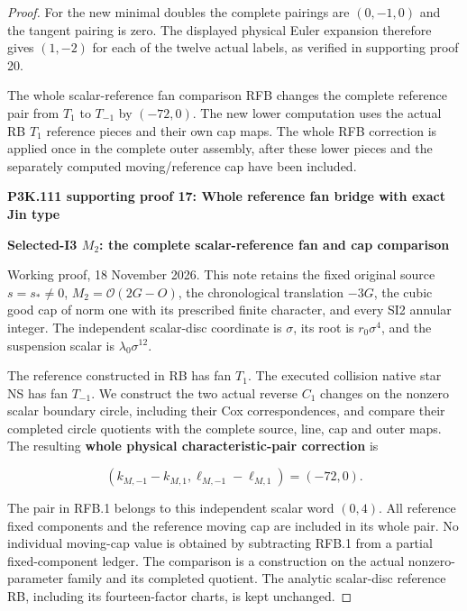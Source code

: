 \begin{proof}
For the new minimal doubles the complete pairings are
\((0,-1,0)\) and the tangent pairing is zero.  The displayed
physical Euler expansion therefore gives \((1,-2)\) for each of the
twelve actual labels, as verified in supporting proof 20.

The whole scalar-reference fan comparison RFB changes
the complete reference pair from \(T_1\) to \(T_{-1}\)
by \((-72,0)\). The new lower computation uses the actual RB \(T_1\)
reference pieces and their own cap maps. The whole RFB
correction is applied once in the complete outer
assembly, after these lower pieces and the separately
computed moving/reference cap have been included.




\par\bigskip\noindent\textbf{P3K.111 supporting proof 17: Whole reference fan bridge with exact Jin type}\par\nobreak
\par

\medskip\noindent\textbf{Selected-I3 \(M_{2}\): the complete scalar-reference fan and cap comparison}

\par\nobreak

Working proof, 18 November 2026. This note retains the fixed original
source \(s=s_*\ne0\), \(M_2=\mathcal O(2G-O)\), the chronological
translation \(-3G\), the cubic good cap of norm one with its prescribed
finite character, and every SI2 annular integer. The independent
scalar-disc coordinate is \(\sigma\), its root is \(r_0\sigma^4\),
and the suspension scalar is \(\lambda_0\sigma^{12}\).

The reference constructed in RB has fan \(T_1\). The executed
collision native star NS has fan \(T_{-1}\). We construct the two
actual reverse \(C_1\) changes on the nonzero scalar boundary circle,
including their Cox correspondences, and compare their completed
circle quotients with the complete source, line, cap and outer maps.
The resulting \textbf{whole physical characteristic-pair correction} is

\[
 (k_{M,-1}-k_{M,1},\ell_{M,-1}-\ell_{M,1})=(-72,0).
 \tag{RFB.1}
\]

The pair in RFB.1 belongs to this independent scalar word \((0,4)\).
All reference fixed components and the reference moving cap are
included in its whole pair. No individual moving-cap value is obtained
by subtracting RFB.1 from a partial fixed-component ledger. The
comparison is a construction on the actual nonzero-parameter family
and its completed quotient. The analytic scalar-disc reference RB,
including its fourteen-factor charts, is kept unchanged.


\end{proof}
